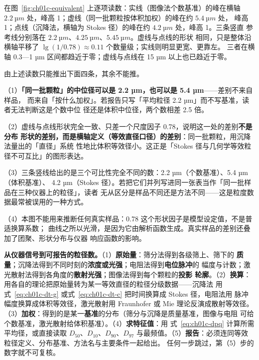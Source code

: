 \begin{obs}
在图~\ref{fig:ch01c-equivalent} 上逐项读数：实线（图像法个数基准）的峰在横轴
$\qty{2.2}{µm}$ 处，峰高 1；虚线（同一批颗粒按体积加权）的峰在约 $\qty{5.4}{µm}$ 处，
峰高 1；点线（沉降法，横轴为 Stokes 径）的峰在约 $\qty{4.2}{µm}$ 处，峰高 1。三条竖直
参考线分别落在 $\qty{2.2}{µm}$、$\qty{4.25}{µm}$、$\qty{5.45}{µm}$。虚线与点线的形状
相同，只是整体沿横轴平移了 $\lg(1/0.78)\approx0.11$ 个数量级；实线则明显更宽、更靠左。
三者在横轴 0.3—1 µm 区间都趋近于零；虚线与点线在 15 µm 以上也已趋近于零。
\end{obs}

\begin{infer}
由上述读数只能推出下面四条，其余不能推。

（1）\textbf{「同一批颗粒」的中位径可以是 2.2 µm，也可以是 5.4 µm}——差别不来自样品，
而来自「按什么加权」。若报告只写「平均粒径 2.2 µm」而不写基准，读者无法判断这是个数中位
径还是体积中位径，两个数相差 2.5 倍。

（2）虚线与点线形状完全一致、只差一个尺度因子 0.78，说明这一处的差别\textbf{不是分布
形状的差别，而是横轴定义（等效直径口径）的差别}：同一批颗粒，用沉降法量出的「直径」系统
性地比体积等效径小。这正是「Stokes 径与几何学等效粒径不可互比」的图形表达。

（3）三条竖线给出的是三个可比性完全不同的数：2.2 µm（个数基准）、5.4 µm（体积基准）、
4.2 µm（Stokes 径）。若把它们并列写进同一张表当作「同一批样品在三种仪器上的粒径」，读者
无从区分是样品不同还是方法不同——这是粒度数据最常被误用的一种方式。

（4）本图不能用来推断任何真实样品：0.78 这个形状因子是模型设定值，不是普适换算系数；
曲线之所以光滑，是因为它由解析函数生成。真实样品的差别还叠加了团聚、形状分布与仪器
响应函数的影响。\modelmark
\end{infer}

\begin{dataflow}
\textbf{从仪器信号到可报告的粒径数。}（1）\textbf{原始量}：筛分法得到各级筛上、筛下的
\textbf{质量}；沉降法得到不同时刻的\textbf{浓度或光强}；电阻法得到\textbf{电位脉冲}的
幅度与计数；激光散射法得到各角度的\textbf{散射光强}；图像法得到每个颗粒的\textbf{投影
轮廓}。（2）\textbf{换算}：用各自的理论把原始量转为某一等效直径的粒径分级数据——沉降法
用式~\eqref{eq:ch01c-dt-g} 或式~\eqref{eq:ch01c-dt-c} 把时间换算成 Stokes 径，电阻法用
脉冲幅度换算成体积等效径，激光散射用 Fraunhofer 或 Mie 理论反演成散射等效径。
（3）\textbf{加权}：得到的是某一\textbf{基准}的分布（筛分与沉降是质量基准，图像与电阻
可给个数基准，激光散射给体积基准）。（4）\textbf{求特征值}：用
式~\eqref{eq:ch01c-dpq} 计算所需平均径，或直接读取 $D_{50}$、$D_{10}$、$D_{90}$、$D_{97}$
与最频值。（5）\textbf{报告}：必须连同等效粒径定义、分布基准、方法名与主要条件一起给出。
任何一步跳过，第（5）步的数字就不可复核。
\end{dataflow}

